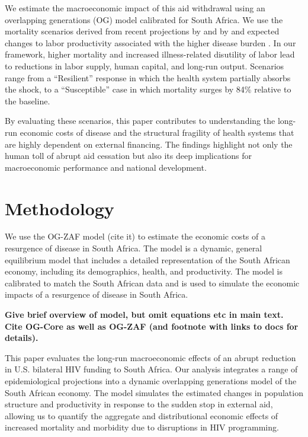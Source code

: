 \documentclass[letterpaper,12pt]{article}
\theoremstyle{definition}
\begin{document}
\begin{spacing}{1.5}
We estimate the macroeconomic impact of this aid withdrawal using an overlapping generations (OG) model calibrated for South Africa. We use the mortality scenarios derived from recent projections by \citet{KS2025} and by \citet{Gandhi2025} and expected changes to labor productivity associated with the higher disease burden \citep{Keogh2024,Panda2024}. In our framework, higher mortality and increased illness-related disutility of labor lead to reductions in labor supply, human capital, and long-run output. Scenarios range from a ``Resilient'' response in which the health system partially absorbs the shock, to a ``Susceptible'' case in which mortality surges by 84\% relative to the baseline. 

By evaluating these scenarios, this paper contributes to understanding the long-run economic costs of disease and the structural fragility of health systems that are highly dependent on external financing. The findings highlight not only the human toll of abrupt aid cessation but also its deep implications for macroeconomic performance and national development.


\section{Methodology}\label{SecMethod}

We use the OG-ZAF model (cite it) to estimate the economic costs of a resurgence of disease in South Africa.  The model is a dynamic, general equilibrium model that includes a detailed representation of the South African economy, including its demographics, health, and productivity.  The model is calibrated to match the South African data and is used to simulate the economic impacts of a resurgence of disease in South Africa.

\textbf{Give brief overview of model, but omit equations etc in main text.  Cite OG-Core as well as OG-ZAF (and footnote with links to docs for details).}

This paper evaluates the long-run macroeconomic effects of an abrupt reduction in U.S. bilateral HIV funding to South Africa. Our analysis integrates a range of epidemiological projections into a dynamic overlapping generations model of the South African economy. The model simulates the estimated changes in population structure and productivity in response to the sudden stop in external aid, allowing us to quantify the aggregate and distributional economic effects of increased mortality and morbidity due to disruptions in HIV programming.


\end{spacing}
\end{document}
